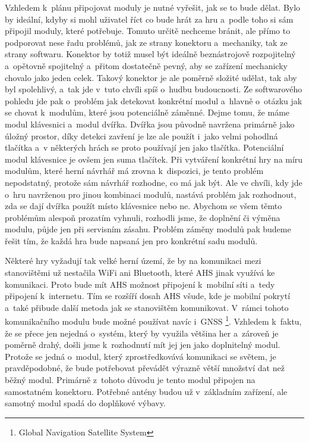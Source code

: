 Vzhledem k~plánu připojovat moduly je nutné vyřešit, jak se to bude dělat.
Bylo by ideální, kdyby si mohl uživatel říct co bude hrát za hru a~podle toho si sám připojil moduly, které potřebuje.
Tomuto určitě nechceme bránit, ale přímo to podporovat nese řadu problémů, jak ze strany konektoru a~mechaniky, tak ze strany softwaru.
Konektor by totiž musel být ideálně beznástrojově rozpojitelný a~opětovně spojitelný a~přitom dostatečně pevný, aby se zařízení mechanicky chovalo jako jeden celek.
Takový konektor je ale poměrně složité udělat, tak aby byl spolehlivý, a~tak jde v~tuto chvíli spíš o~hudbu budoucnosti.
Ze softwarového pohledu jde pak o~problém jak detekovat konkrétní modul a~hlavně o~otázku jak se chovat k~modulům, které jsou potenciálně záměnné.
Dejme tomu, že máme modul klávesnici a~modul dvířka.
Dvířka jsou původně navržena primárně jako úložný prostor, díky detekci zavření je lze ale použít i~jako velmi pohodlná tlačítka a~v některých hrách se proto používají jen jako tlačítka.
Potenciální modul klávesnice je ovšem jen suma tlačítek.
Při vytváření konkrétní hry na míru modulům, které herní návrhář má zrovna k~dispozici, je tento problém nepodstatný, protože sám návrhář rozhodne, co má jak být.
Ale ve chvíli, kdy jde o~hru navrženou pro jinou kombinaci modulů, nastává problém jak rozhodnout, zda se dají dvířka použít místo klávesnice nebo ne.
Abychom se všem těmto problémům alespoň prozatím vyhnuli, rozhodli jsme, že doplnění či výměna modulu, půjde jen při servisním zásahu.
Problém záměny modulů pak budeme řešit tím, že každá hra bude napsaná jen pro konkrétní sadu modulů.

Některé hry vyžadují tak velké herní území, že by na komunikaci mezi stanovištěmi už nestačila WiFi ani Bluetooth, které AHS jinak využívá ke komunikaci.  
Proto bude mít AHS možnost připojení k~mobilní síti a~tedy připojení k~internetu.
Tím se rozšíří dosah AHS všude, kde je mobilní pokrytí a~také přibude další metoda jak se stanovištěm komunikovat.
V~rámci tohoto komunikačního modulu bude možné používat navíc i~GNSS \footnote{Global Navigation Satellite System}.
Vzhledem k~faktu, že se přece jen nejedná o~systém, který by využila většina her a~zároveň je poměrně drahý, došli jsme k~rozhodnutí mít jej jen jako doplnitelný modul.
Protože se jedná o~modul, který zprostředkovává komunikaci se světem, je pravděpodobné, že bude potřebovat převádět výrazně větší množství dat než běžný modul.
Primárně z~tohoto důvodu je tento modul připojen na samostatném konektoru.
Potřebné antény budou už v~základním zařízení, ale samotný modul spadá do doplňkové výbavy.

